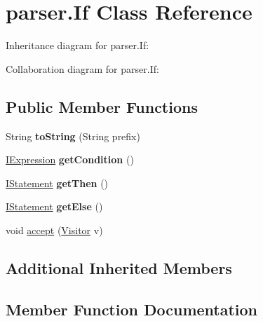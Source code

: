 \hypertarget{classparser_1_1_if}{}\section{parser.\+If Class Reference}
\label{classparser_1_1_if}


Inheritance diagram for parser.\+If\+:


Collaboration diagram for parser.\+If\+:
\subsection*{Public Member Functions}
\begin{DoxyCompactItemize}
\item 
String {\bfseries to\+String} (String prefix)\hypertarget{classparser_1_1_if_a3a82998686fb36724b131ee4a84a5a0f}{}\label{classparser_1_1_if_a3a82998686fb36724b131ee4a84a5a0f}

\item 
\hyperlink{interfaceparser_1_1_i_expression}{I\+Expression} {\bfseries get\+Condition} ()\hypertarget{classparser_1_1_if_aa8059125d1e21fd1094420122f71ff89}{}\label{classparser_1_1_if_aa8059125d1e21fd1094420122f71ff89}

\item 
\hyperlink{interfaceparser_1_1_i_statement}{I\+Statement} {\bfseries get\+Then} ()\hypertarget{classparser_1_1_if_ae05a97bec3f89522629cfde434dd35ce}{}\label{classparser_1_1_if_ae05a97bec3f89522629cfde434dd35ce}

\item 
\hyperlink{interfaceparser_1_1_i_statement}{I\+Statement} {\bfseries get\+Else} ()\hypertarget{classparser_1_1_if_a88708b1ee144a461f4767bba941166f0}{}\label{classparser_1_1_if_a88708b1ee144a461f4767bba941166f0}

\item 
void \hyperlink{classparser_1_1_if_a4709295818047af8c8b553a7c8b6f242}{accept} (\hyperlink{interfacemain_1_1_visitor}{Visitor} v)
\end{DoxyCompactItemize}
\subsection*{Additional Inherited Members}


\subsection{Member Function Documentation}

